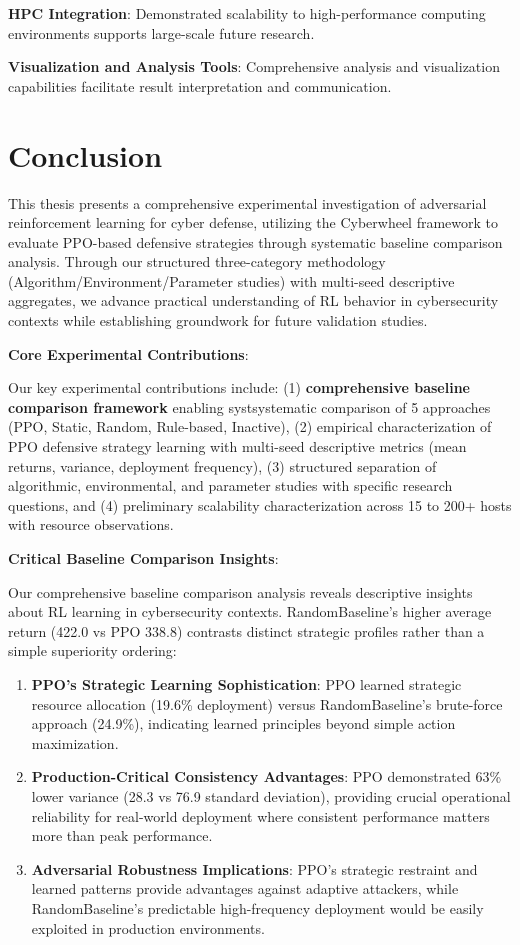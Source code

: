 \documentclass[12pt,twoside]{article}
\theoremstyle{definition}
\theoremstyle{plain}
\begin{document}
\textbf{HPC Integration}: Demonstrated scalability to high-performance computing environments supports large-scale future research.

\textbf{Visualization and Analysis Tools}: Comprehensive analysis and visualization capabilities facilitate result interpretation and communication.

\section{Conclusion}

This thesis presents a comprehensive experimental investigation of adversarial reinforcement learning for cyber defense, utilizing the Cyberwheel framework to evaluate PPO-based defensive strategies through systematic baseline comparison analysis. Through our structured three-category methodology (Algorithm/Environment/Parameter studies) with multi-seed descriptive aggregates, we advance practical understanding of RL behavior in cybersecurity contexts while establishing groundwork for future validation studies.

\textbf{Core Experimental Contributions}:

Our key experimental contributions include: (1) \textbf{comprehensive baseline comparison framework} enabling systsystematic comparison of 5 approaches (PPO, Static, Random, Rule-based, Inactive), (2) empirical characterization of PPO defensive strategy learning with multi-seed descriptive metrics (mean returns, variance, deployment frequency), (3) structured separation of algorithmic, environmental, and parameter studies with specific research questions, and (4) preliminary scalability characterization across 15 to 200+ hosts with resource observations.

\textbf{Critical Baseline Comparison Insights}:

Our comprehensive baseline comparison analysis reveals descriptive insights about RL learning in cybersecurity contexts. RandomBaseline's higher average return (422.0 vs PPO 338.8) contrasts distinct strategic profiles rather than a simple superiority ordering:

\begin{enumerate}
\item \textbf{PPO's Strategic Learning Sophistication}: PPO learned strategic resource allocation (19.6\% deployment) versus RandomBaseline's brute-force approach (24.9\%), indicating learned principles beyond simple action maximization.

\item \textbf{Production-Critical Consistency Advantages}: PPO demonstrated 63\% lower variance (28.3 vs 76.9 standard deviation), providing crucial operational reliability for real-world deployment where consistent performance matters more than peak performance.

\item \textbf{Adversarial Robustness Implications}: PPO's strategic restraint and learned patterns provide advantages against adaptive attackers, while RandomBaseline's predictable high-frequency deployment would be easily exploited in production environments.
\end{enumerate}
\end{document}
